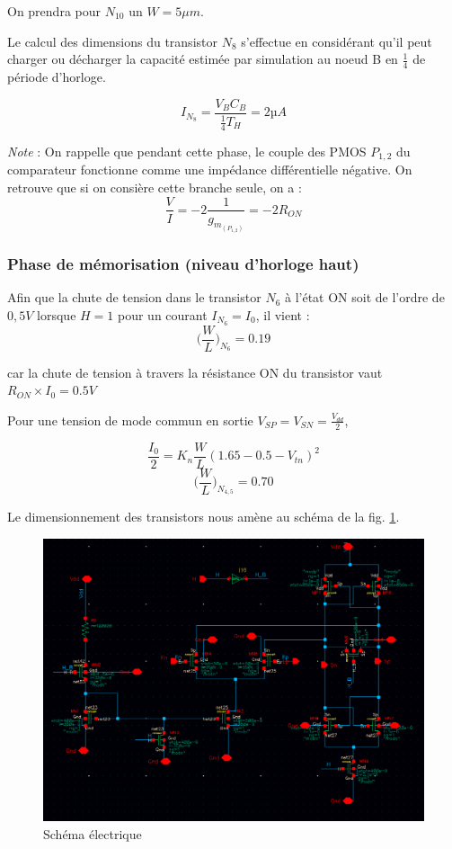 \documentclass[11pt]{article}
\begin{document}
On prendra pour $N_{10}$ un $W = 5 \mu m$.

Le calcul des dimensions du transistor $N_8$ s'effectue en consid\'erant qu'il peut charger ou d\'echarger
la capacit\'e estim\'ee par simulation au noeud B en $\frac{1}{4}$ de p\'eriode d'horloge.

\[
I_{N_8} = \frac {V_B C_B}{\frac{1}{4} T_H} = 2 µA
\]

\textit{Note} : On rappelle que pendant cette phase, le couple des PMOS $P_{1,2}$ du comparateur fonctionne comme une imp\'edance diff\'erentielle n\'egative\cite{Razavi-Data-Conversion}. On retrouve que si on consi\`ere cette branche seule, on a :
\[
\frac{V}{I}= -2 \frac{1}{g_m_{(P_{1,2})}} = -2 R_{ON}
\]


\subsubsection{Phase de m\'emorisation (niveau d'horloge haut)}

Afin que la chute de tension dans le transistor $N_6$  \`a l'\'etat ON soit de l'ordre de $0,5 V$ lorsque $H=1$
pour un courant $I_{N_6}= I_0$, il vient :
\[
  \bigg(\frac{W}{L} \bigg)_{N_6} = 0.19
\]

car la chute de tension \`a travers la r\'esistance ON du transistor vaut $R_{ON} \times I_0 = 0.5V$

Pour une tension de mode commun en sortie $V_{SP}=V_{SN} = \frac{V_{dd}}{2}$,

\[
  \frac{I_0}{2} = K_n \frac{W}{L}(1.65-0.5 - V_{tn})^2
\]
\[
  \bigg(\frac{W}{L} \bigg)_{N_{4,5}} = 0.70
\]

Le dimensionnement des transistors nous am\`ene au sch\'ema de la fig. \ref{fig:schcomp}.


\clearpage

\begin{figure}[!htb]
      \centering
      \includegraphics[width=0.8\linewidth]{comparateur_schema_cadence_.png}
      \caption{Sch\'ema \'electrique}
      \label{fig:schcomp}
\end{figure}%
\end{document}
